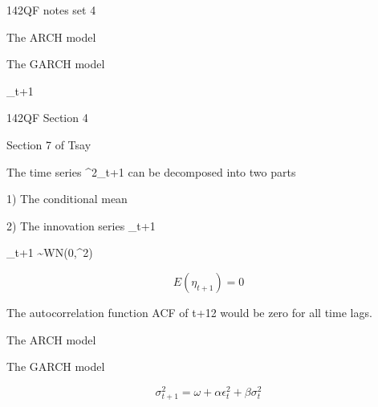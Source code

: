 142QF notes set 4

The ARCH model

The GARCH model

\eta_{t+1}

142QF Section 4

 

Section 7 of Tsay

 

The time series \epsilon^2_{t+1} can be decomposed into two parts

1) The conditional mean

2) The innovation series \eta_{t+1}

\eta_{t+1}  \sim WN(0,\sigma^2)

\[ E(\eta_{t+1}) = 0\]

The autocorrelation function ACF of t+12 would be zero for all time lags.

The ARCH model


The GARCH model

\[ \sigma^2_{t+1} = \omega +\alpha \epsilon^2_t + \beta \sigma^2_t \]


